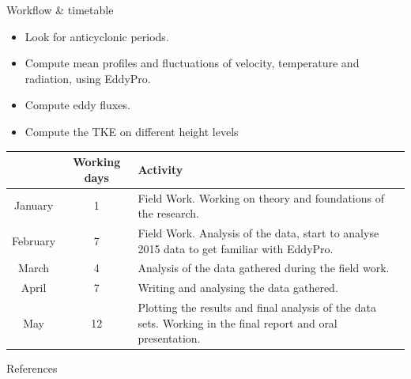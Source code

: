 \documentclass{beamer}
\begin{document}
\begin{frame}{Workflow \& timetable}

\begin{itemize}
    \item Look for anticyclonic periods.
    \item Compute mean profiles and fluctuations of velocity, temperature and radiation, using EddyPro.
    \item Compute eddy fluxes.
\item Compute the TKE on different height levels 
\end{itemize}

\begin{table}[ht!]
\scriptsize 
\begin{center}
\begin{tabular}{|c|c|p{6cm}|}
\hline
  & \textbf{Working days} & \textbf{Activity} \\
\hline
January & 1 & Field Work. Working on theory and foundations of the research.\\
\hline
February & 7 & Field Work. Analysis of the data, start to analyse 2015 data to get familiar with EddyPro.\\
\hline
March & 4 & Analysis of the data gathered during the field work.\\
\hline
April & 7 & Writing and analysing the data gathered.\\
\hline
May & 12 & Plotting the results and final analysis of the data sets. Working in the final report and oral presentation.\\
\hline
\end{tabular}

\label{table:schedule}
\end{center}
\end{table}


\end{frame}


\begin{frame}[allowframebreaks]{References}%
    \footnotesize
    
    \nocite{*}
    
    
\end{frame}
\end{document}
